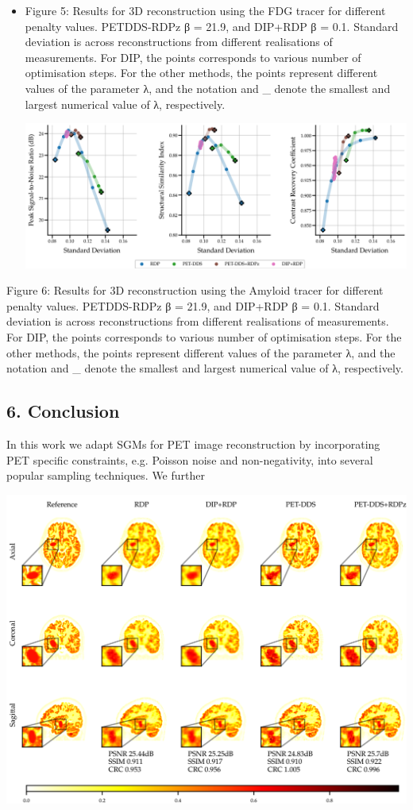 \documentclass{article}
\begin{document}
\begin{itemize}
\item 
Figure 5: Results for 3D reconstruction using the FDG tracer for different penalty values. PETDDS-RDPz β = 21.9, and DIP+RDP β = 0.1. Standard deviation is across reconstructions from different realisations of measurements. For DIP, the points corresponds to various number of optimisation steps. For the other methods, the points represent different values of the parameter λ, and the notation and \_ denote the smallest and largest numerical value of λ, respectively.

\includegraphics{_page_19_Figure_3.png}


\end{itemize}

Figure 6: Results for 3D reconstruction using the Amyloid tracer for different penalty values. PETDDS-RDPz β = 21.9, and DIP+RDP β = 0.1. Standard deviation is across reconstructions from different realisations of measurements. For DIP, the points corresponds to various number of optimisation steps. For the other methods, the points represent different values of the parameter λ, and the notation and \_ denote the smallest and largest numerical value of λ, respectively.

\subsection{6. Conclusion}

In this work we adapt SGMs for PET image reconstruction by incorporating PET specific constraints, e.g. Poisson noise and non-negativity, into several popular sampling techniques. We further


\includegraphics{_page_20_Figure_1.png}
\end{document}
